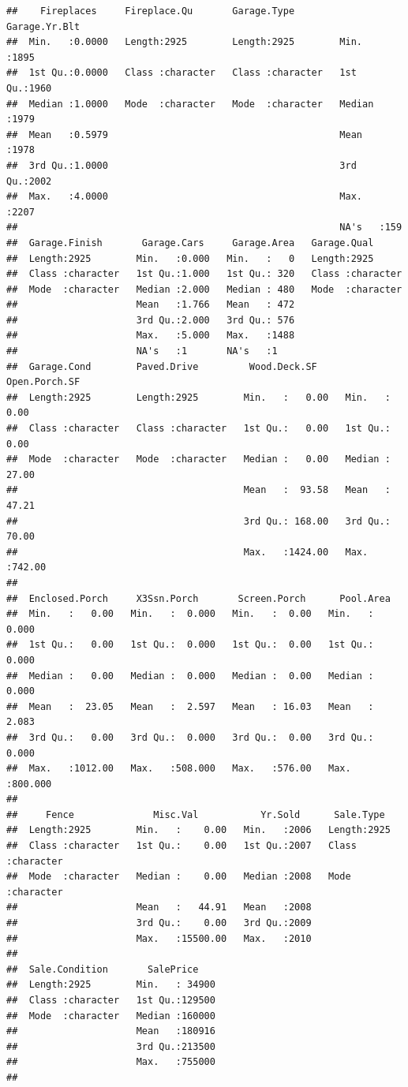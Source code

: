 \documentclass[
]{article}
\begin{document}
\begin{verbatim}
##    Fireplaces     Fireplace.Qu       Garage.Type        Garage.Yr.Blt 
##  Min.   :0.0000   Length:2925        Length:2925        Min.   :1895  
##  1st Qu.:0.0000   Class :character   Class :character   1st Qu.:1960  
##  Median :1.0000   Mode  :character   Mode  :character   Median :1979  
##  Mean   :0.5979                                         Mean   :1978  
##  3rd Qu.:1.0000                                         3rd Qu.:2002  
##  Max.   :4.0000                                         Max.   :2207  
##                                                         NA's   :159   
##  Garage.Finish       Garage.Cars     Garage.Area   Garage.Qual       
##  Length:2925        Min.   :0.000   Min.   :   0   Length:2925       
##  Class :character   1st Qu.:1.000   1st Qu.: 320   Class :character  
##  Mode  :character   Median :2.000   Median : 480   Mode  :character  
##                     Mean   :1.766   Mean   : 472                     
##                     3rd Qu.:2.000   3rd Qu.: 576                     
##                     Max.   :5.000   Max.   :1488                     
##                     NA's   :1       NA's   :1                        
##  Garage.Cond        Paved.Drive         Wood.Deck.SF     Open.Porch.SF   
##  Length:2925        Length:2925        Min.   :   0.00   Min.   :  0.00  
##  Class :character   Class :character   1st Qu.:   0.00   1st Qu.:  0.00  
##  Mode  :character   Mode  :character   Median :   0.00   Median : 27.00  
##                                        Mean   :  93.58   Mean   : 47.21  
##                                        3rd Qu.: 168.00   3rd Qu.: 70.00  
##                                        Max.   :1424.00   Max.   :742.00  
##                                                                          
##  Enclosed.Porch     X3Ssn.Porch       Screen.Porch      Pool.Area      
##  Min.   :   0.00   Min.   :  0.000   Min.   :  0.00   Min.   :  0.000  
##  1st Qu.:   0.00   1st Qu.:  0.000   1st Qu.:  0.00   1st Qu.:  0.000  
##  Median :   0.00   Median :  0.000   Median :  0.00   Median :  0.000  
##  Mean   :  23.05   Mean   :  2.597   Mean   : 16.03   Mean   :  2.083  
##  3rd Qu.:   0.00   3rd Qu.:  0.000   3rd Qu.:  0.00   3rd Qu.:  0.000  
##  Max.   :1012.00   Max.   :508.000   Max.   :576.00   Max.   :800.000  
##                                                                        
##     Fence              Misc.Val           Yr.Sold      Sale.Type        
##  Length:2925        Min.   :    0.00   Min.   :2006   Length:2925       
##  Class :character   1st Qu.:    0.00   1st Qu.:2007   Class :character  
##  Mode  :character   Median :    0.00   Median :2008   Mode  :character  
##                     Mean   :   44.91   Mean   :2008                     
##                     3rd Qu.:    0.00   3rd Qu.:2009                     
##                     Max.   :15500.00   Max.   :2010                     
##                                                                         
##  Sale.Condition       SalePrice     
##  Length:2925        Min.   : 34900  
##  Class :character   1st Qu.:129500  
##  Mode  :character   Median :160000  
##                     Mean   :180916  
##                     3rd Qu.:213500  
##                     Max.   :755000  
## 
\end{verbatim}
\end{document}
